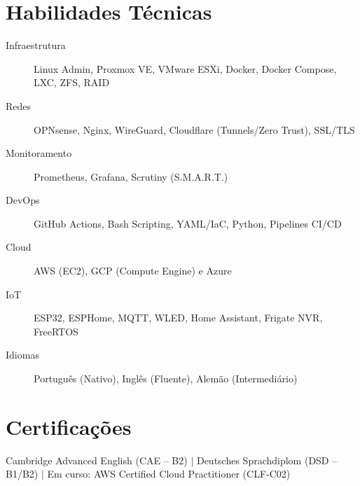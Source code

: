 \documentclass[11.5pt]{article}
\begin{document}
\section{Habilidades T\'{e}cnicas}
\begin{description}
	\item[Infraestrutura] Linux Admin, Proxmox VE, VMware ESXi, Docker, Docker Compose, LXC, ZFS, RAID
	\item[Redes] OPNsense, Nginx, WireGuard, Cloudflare (Tunnels/Zero Trust), SSL/TLS
	\item[Monitoramento] Prometheus, Grafana, Scrutiny (S.M.A.R.T.)
	\item[DevOps] GitHub Actions, Bash Scripting, YAML/IaC, Python, Pipelines CI/CD
	\item[Cloud] AWS (EC2), GCP (Compute Engine) e Azure
	\item[IoT] ESP32, ESPHome, MQTT, WLED, Home Assistant, Frigate NVR, FreeRTOS
	\item[Idiomas] Portugu\^{e}s (Nativo), Ingl\^{e}s (Fluente), Alem\~{a}o (Intermedi\'{a}rio)
\end{description}

\section{Certifica\c{c}\~{o}es}
Cambridge Advanced English (CAE -- B2) $|$ Deutsches Sprachdiplom (DSD -- B1/B2) $|$ Em curso: AWS Certified Cloud Practitioner (CLF-C02)
\end{document}
